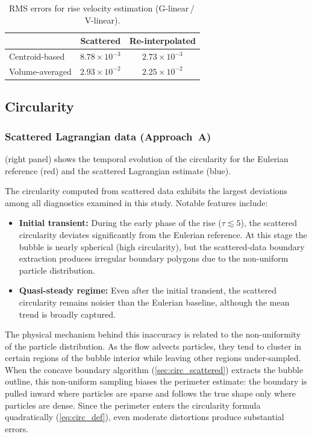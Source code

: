 \documentclass[11pt,a4paper]{article}
\begin{document}
\begin{table}[ht]
\centering
\caption{RMS errors for rise velocity estimation (G-linear\,/\,V-linear).}
\label{tab:rms_rise}
\begin{tabular}{l cc}
  \toprule
  & \textbf{Scattered} & \textbf{Re-interpolated} \\
  \midrule
  Centroid-based & $8.78 \times 10^{-3}$ & $2.73 \times 10^{-3}$ \\
  Volume-averaged & $2.93 \times 10^{-2}$ & $2.25 \times 10^{-2}$ \\
  \bottomrule
\end{tabular}
\end{table}


\subsection{Circularity}\label{sec:results_circ}

\subsubsection{Scattered Lagrangian data (Approach~A)}

 (right panel) shows the temporal evolution of the
circularity for the Eulerian reference (red) and the scattered Lagrangian
estimate (blue).

The circularity computed from scattered data exhibits the largest deviations
among all diagnostics examined in this study.  Notable features include:
\begin{itemize}
  \item \textbf{Initial transient:} During the early phase of the rise
    ($\tau \lesssim 5$), the scattered circularity deviates significantly
    from the Eulerian reference.  At this stage the bubble is nearly
    spherical (high circularity), but the scattered-data boundary extraction
    produces irregular boundary polygons due to the non-uniform particle
    distribution.
  \item \textbf{Quasi-steady regime:} Even after the initial transient, the
    scattered circularity remains noisier than the Eulerian baseline,
    although the mean trend is broadly captured.
\end{itemize}

The physical mechanism behind this inaccuracy is related to the
non-uniformity of the particle distribution.  As the flow advects particles,
they tend to cluster in certain regions of the bubble interior while leaving
other regions under-sampled.  When the concave boundary algorithm
(\cref{sec:circ_scattered}) extracts the bubble outline, this non-uniform
sampling biases the perimeter estimate: the boundary is pulled inward where
particles are sparse and follows the true shape only where particles are
dense.  Since the perimeter enters the circularity formula quadratically
(\cref{eq:circ_def}), even moderate distortions produce substantial errors.
\end{document}
